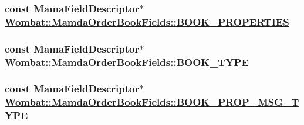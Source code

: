 \hypertarget{classWombat_1_1MamdaOrderBookFields_867fd7b7676f0520810b5afddb4c33ce}{
\subsubsection[BOOK\_\-PROPERTIES]{\setlength{\rightskip}{0pt plus 5cm}const Mama\-Field\-Descriptor$\ast$ \hyperlink{classWombat_1_1MamdaOrderBookFields_867fd7b7676f0520810b5afddb4c33ce}{Wombat::Mamda\-Order\-Book\-Fields::BOOK\_\-PROPERTIES}}}
\label{classWombat_1_1MamdaOrderBookFields_867fd7b7676f0520810b5afddb4c33ce}


\hypertarget{classWombat_1_1MamdaOrderBookFields_0004d0b389819a6dfa94be11f9ea25ff}{
\subsubsection[BOOK\_\-TYPE]{\setlength{\rightskip}{0pt plus 5cm}const Mama\-Field\-Descriptor$\ast$ \hyperlink{classWombat_1_1MamdaOrderBookFields_0004d0b389819a6dfa94be11f9ea25ff}{Wombat::Mamda\-Order\-Book\-Fields::BOOK\_\-TYPE}}}
\label{classWombat_1_1MamdaOrderBookFields_0004d0b389819a6dfa94be11f9ea25ff}


\hypertarget{classWombat_1_1MamdaOrderBookFields_df81cad9ff8d769c4cd3f15b07ba4d20}{
\subsubsection[BOOK\_\-PROP\_\-MSG\_\-TYPE]{\setlength{\rightskip}{0pt plus 5cm}const Mama\-Field\-Descriptor$\ast$ \hyperlink{classWombat_1_1MamdaOrderBookFields_df81cad9ff8d769c4cd3f15b07ba4d20}{Wombat::Mamda\-Order\-Book\-Fields::BOOK\_\-PROP\_\-MSG\_\-TYPE}}}
\label{classWombat_1_1MamdaOrderBookFields_df81cad9ff8d769c4cd3f15b07ba4d20}


